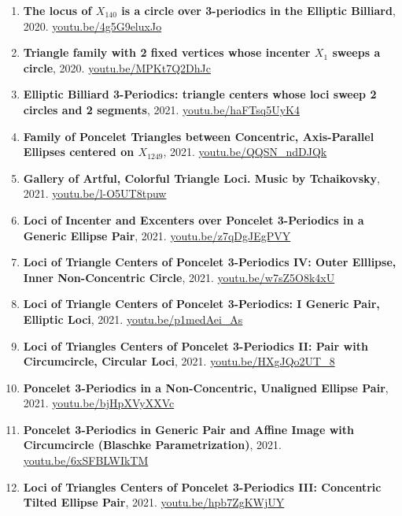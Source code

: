 \documentclass[12pt]{article}
\begin{document}
\begin{enumerate}[resume]
\item \textbf{The locus of $X_{140}$ is a circle over 3-periodics in the Elliptic Billiard}, 2020. \href{https://youtu.be/4g5G9eluxJo}{\url{youtu.be/4g5G9eluxJo}}
\item \textbf{Triangle family with 2 fixed vertices whose incenter $X_{1}$ sweeps a circle}, 2020. \href{https://youtu.be/MPKt7Q2DhJc}{\url{youtu.be/MPKt7Q2DhJc}}
\item \textbf{Elliptic Billiard 3-Periodics: triangle centers whose loci sweep 2 circles and 2 segments}, 2021. \href{https://youtu.be/haFTsq5UyK4}{\url{youtu.be/haFTsq5UyK4}}
\item \textbf{Family of Poncelet Triangles between Concentric, Axis-Parallel Ellipses centered on $X_{1249}$}, 2021. \href{https://youtu.be/QQSN_ndDJQk}{\url{youtu.be/QQSN\_ndDJQk}}
\item \textbf{Gallery of Artful, Colorful Triangle Loci. Music by Tchaikovsky}, 2021. \href{https://youtu.be/l-O5UT8tpuw}{\url{youtu.be/l-O5UT8tpuw}}
\item \textbf{Loci of Incenter and Excenters over Poncelet 3-Periodics in a Generic Ellipse Pair}, 2021. \href{https://youtu.be/z7qDgJEgPVY}{\url{youtu.be/z7qDgJEgPVY}}
\item \textbf{Loci of Triangle Centers of Poncelet 3-Periodics IV: Outer Elllipse, Inner Non-Concentric Circle}, 2021. \href{https://youtu.be/w7sZ5O8k4xU}{\url{youtu.be/w7sZ5O8k4xU}}
\item \textbf{Loci of Triangle Centers of Poncelet 3-Periodics: 
I Generic Pair, Elliptic Loci}, 2021. \href{https://youtu.be/p1medAei_As}{\url{youtu.be/p1medAei\_As}}
\item \textbf{Loci of Triangles Centers of Poncelet 3-Periodics II: Pair with Circumcircle, Circular Loci}, 2021. \href{https://youtu.be/HXgJQo2UT_8}{\url{youtu.be/HXgJQo2UT\_8}}
\item \textbf{Poncelet 3-Periodics in a Non-Concentric, Unaligned Ellipse Pair}, 2021. \href{https://youtu.be/bjHpXVyXXVc}{\url{youtu.be/bjHpXVyXXVc}}
\item \textbf{Poncelet 3-Periodics in Generic Pair and Affine Image with Circumcircle (Blaschke Parametrization)}, 2021. \href{https://youtu.be/6xSFBLWIkTM}{\url{youtu.be/6xSFBLWIkTM}}
\item \textbf{Loci of Triangles Centers of Poncelet 3-Periodics III: Concentric Tilted Ellipse Pair}, 2021. \href{https://youtu.be/hpb7ZgKWjUY}{\url{youtu.be/hpb7ZgKWjUY}}
\end{enumerate}
\end{document}

